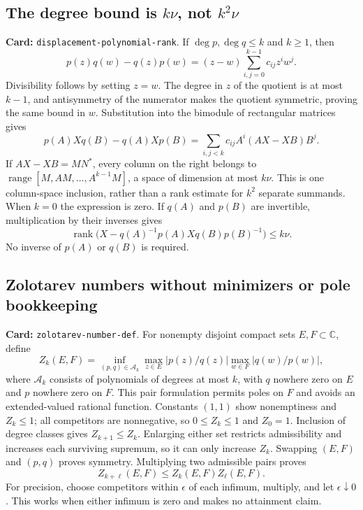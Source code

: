 \documentclass[11pt,a4paper]{article}
\newcommand{\C}{\mathbb C}
\newcommand{\abs}[1]{\left|#1\right|}
\DeclareMathOperator{\rank}{rank}
\DeclareRobustCommand{\code}[1]{{\footnotesize\urlstyle{tt}\nolinkurl{#1}}}
\begin{document}
\subsection{The degree bound is $k\nu$, not $k^2\nu$}
\label{route:displacement-polynomial-rank}
\textbf{Card:} \code{displacement-polynomial-rank}.
If $\deg p,\deg q\le k$ and $k\ge1$, then
\[
 p(z)q(w)-q(z)p(w)=(z-w)\sum_{i,j=0}^{k-1}c_{ij}z^iw^j. \tag{D1}
\]
Divisibility follows by setting $z=w$. The degree in $z$ of the quotient
is at most $k-1$, and antisymmetry of the numerator makes the quotient
symmetric, proving the same bound in $w$. Substitution into the bimodule
of rectangular matrices gives
\[
 p(A)Xq(B)-q(A)Xp(B)
 =\sum_{i,j<k}c_{ij}A^i(AX-XB)B^j.
\]
If $AX-XB=MN^*$, every column on the right belongs to
$\operatorname{range}[M,AM,\ldots,A^{k-1}M]$, a space of dimension at most
$k\nu$. This is one column-space inclusion, rather than a rank estimate
for $k^2$ separate summands. When $k=0$ the expression is zero.
If $q(A)$ and $p(B)$ are invertible, multiplication by their inverses gives
\[
 \rank\bigl(X-q(A)^{-1}p(A)Xq(B)p(B)^{-1}\bigr)\le k\nu. \tag{D2}
\]
No inverse of $p(A)$ or $q(B)$ is required.

\subsection{Zolotarev numbers without minimizers or pole bookkeeping}
\label{route:zolotarev-number-def}
\textbf{Card:} \code{zolotarev-number-def}.
For nonempty disjoint compact sets $E,F\subset\C$, define
\[
 Z_k(E,F)=\inf_{(p,q)\in\mathcal A_k}
  \max_{z\in E}\abs{p(z)/q(z)}\max_{w\in F}\abs{q(w)/p(w)},
\]
where $\mathcal A_k$ consists of polynomials of degrees at most $k$,
with $q$ nowhere zero on $E$ and $p$ nowhere zero on $F$.
This pair formulation permits poles on $F$ and avoids an extended-valued
rational function. Constants $(1,1)$ show nonemptiness and $Z_k\le1$;
all competitors are nonnegative, so $0\le Z_k\le1$ and $Z_0=1$.
Inclusion of degree classes gives $Z_{k+1}\le Z_k$.
Enlarging either set restricts admissibility and increases each surviving
supremum, so it can only increase $Z_k$.
Swapping $(E,F)$ and $(p,q)$ proves symmetry.
Multiplying two admissible pairs proves
\[
 Z_{k+\ell}(E,F)\le Z_k(E,F)Z_\ell(E,F).
\]
For precision, choose competitors within $\epsilon$ of each infimum,
multiply, and let $\epsilon\downarrow0$. This works when either infimum
is zero and makes no attainment claim.
\end{document}
